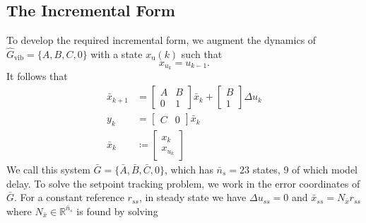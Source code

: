 \documentclass[twocolumn,twoside]{IEEEtran}
\newcommand{\du}{\ensuremath{\Delta u }\xspace}
\newcommand{\Gd}{\ensuremath{\bar G }\xspace}
\newcommand{\Ad}{\ensuremath{\bar A }\xspace}
\newcommand{\Bd}{\ensuremath{\bar B }\xspace}
\newcommand{\Cd}{\ensuremath{\bar C }\xspace}
\newcommand{\xd}{\ensuremath{\bar x }\xspace}
\newcommand{\x}{\ensuremath{x }\xspace}
\newcommand{\xdss}{\ensuremath{\bar x_{ss} }\xspace}
\newcommand{\y}{\ensuremath{y} \xspace}
\newcommand{\hGv}{\ensuremath{\hat{G}_{\text{vib}}}\xspace}
\begin{document}
\subsection{The Incremental Form}\label{sec:incremental}
To develop the required incremental form, we augment the dynamics of \(\hGv=\{A,B,C,0\}\) with a state \(\x_{\text{u}}(k)\) such that
\begin{equation*}
  \x_{u_k} = u_{k-1}.\nonumber
\end{equation*}
It follows that
\begin{subequations}
\begin{align}
  \xd_{k+1}
  &=
    \begin{bmatrix}
      A & B\\ 0 & 1
    \end{bmatrix}
                  \xd_k
    +
    \begin{bmatrix}
      B\\1
    \end{bmatrix}
  \Delta u_k \label{eqn:deltadyn} \\
  \y_k & = \begin{bmatrix}C & 0\end{bmatrix}\xd_k\\
    \xd_k& \coloneqq
    \begin{bmatrix}\x_k\\\x_{u_k} \end{bmatrix}
\end{align}\label{eqn:ssdelta}%
\end{subequations}
We call this system \(\Gd = \{\Ad, \Bd, \Cd, 0\}\), which has \({\bar{n}_s=23}\) states, 9 of which model delay.
To solve the setpoint tracking problem, we work in the error
coordinates of \(\Gd\).
For a constant reference \(r_{ss}\), in steady state we have \({\du_{ss}=0}\) and \({\xdss =N_{\xd}r_{ss}}\) where \({N_{\xd}\in\mathds{R}^{\bar{n}_s}}\) is found by solving
\end{document}
